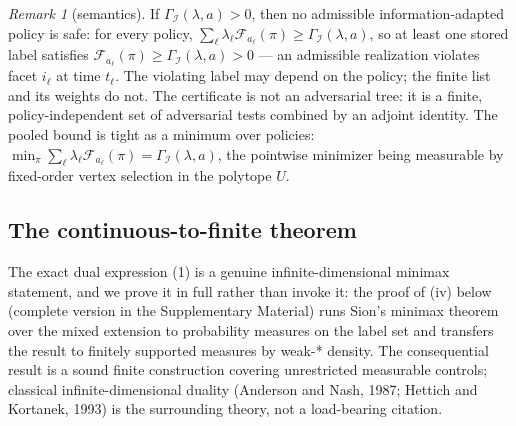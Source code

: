 \documentclass[10pt,twocolumn]{article}
\theoremstyle{plain}
\theoremstyle{definition}
\theoremstyle{remark}
\newtheorem{remark}[theorem]{Remark}
\begin{document}
\begin{remark}[semantics]\label{rem:semantics}
If \(\Gamma_{\mathcal{I}}(\lambda, a) > 0\), then no admissible
information-adapted policy is safe: for every policy,
\(\sum_\ell \lambda_\ell \mathcal{F}_{a_\ell}(\pi) \ge
\Gamma_{\mathcal{I}}(\lambda, a)\), so at least one stored label satisfies
\(\mathcal{F}_{a_\ell}(\pi) \ge \Gamma_{\mathcal{I}}(\lambda, a) > 0\) ---
an admissible realization violates facet \(i_\ell\) at time \(t_\ell\). The
violating label may depend on the policy; the finite list and its weights do
not. The certificate is not an adversarial tree: it is a finite,
policy-independent set of adversarial tests combined by an adjoint identity.
The pooled bound is tight as a minimum over policies:
\(\min_{\pi} \sum_\ell \lambda_\ell \mathcal{F}_{a_\ell}(\pi) =
\Gamma_{\mathcal{I}}(\lambda, a)\), the pointwise minimizer being
measurable by fixed-order vertex selection in the polytope \(U\).
\end{remark}

\subsection{The continuous-to-finite theorem}\label{bridge}

The exact dual expression (1) is a genuine infinite-dimensional minimax
statement, and we prove it in full rather than invoke it: the proof of
(iv) below (complete version in the Supplementary Material) runs Sion's
minimax theorem over the mixed extension to probability measures on the
label set and transfers the result to finitely supported measures by
weak-* density. The consequential result is a sound finite construction
covering unrestricted measurable controls; classical infinite-dimensional
duality (Anderson and Nash, 1987; Hettich and Kortanek, 1993) is the
surrounding theory, not a load-bearing citation.
\end{document}
